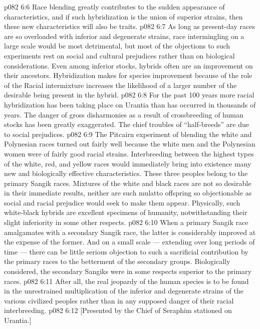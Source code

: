\vs p082 6:6 Race blending greatly contributes to the sudden appearance of  characteristics, and if such hybridization is the union of superior strains, then these new characteristics will also be  traits.
\vs p082 6:7 As long as present\hyp{}day races are so overloaded with inferior and degenerate strains, race intermingling on a large scale would be most detrimental, but most of the objections to such experiments rest on social and cultural prejudices rather than on biological considerations. Even among inferior stocks, hybrids often are an improvement on their ancestors. Hybridization makes for species improvement because of the role of the  Racial intermixture increases the likelihood of a larger number of the desirable  being present in the hybrid.
\vs p082 6:8 \pc For the past 100 years more racial hybridization has been taking place on Urantia than has occurred in thousands of years. The danger of gross disharmonies as a result of crossbreeding of human stocks has been greatly exaggerated. The chief troubles of “half\hyp{}breeds” are due to social prejudices.
\vs p082 6:9 The Pitcairn experiment of blending the white and Polynesian races turned out fairly well because the white men and the Polynesian women were of fairly good racial strains. Interbreeding between the highest types of the white, red, and yellow races would immediately bring into existence many new and biologically effective characteristics. These three peoples belong to the primary Sangik races. Mixtures of the white and black races are not so desirable in their immediate results, neither are such mulatto offspring so objectionable as social and racial prejudice would seek to make them appear. Physically, such white\hyp{}black hybrids are excellent specimens of humanity, notwithstanding their slight inferiority in some other respects.
\vs p082 6:10 \pc When a primary Sangik race amalgamates with a secondary Sangik race, the latter is considerably improved at the expense of the former. And on a small scale --- extending over long periods of time --- there can be little serious objection to such a sacrificial contribution by the primary races to the betterment of the secondary groups. Biologically considered, the secondary Sangiks were in some respects superior to the primary races.
\vs p082 6:11 After all, the real jeopardy of the human species is to be found in the unrestrained multiplication of the inferior and degenerate strains of the various civilized peoples rather than in any supposed danger of their racial interbreeding.
\vsetoff
\vs p082 6:12 [Presented by the Chief of Seraphim stationed on Urantia.]
\quizlink
